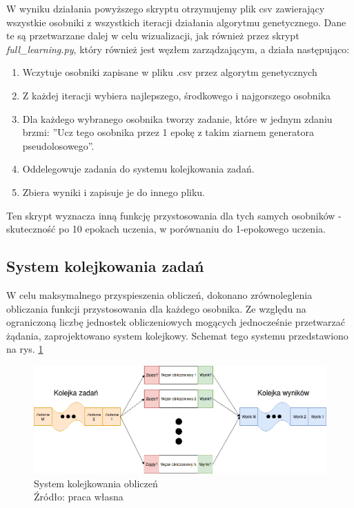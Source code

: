 W wyniku działania powyższego skryptu otrzymujemy plik csv zawierający wszystkie osobniki z wszystkich iteracji działania algorytmu genetycznego.
Dane te są przetwarzane dalej w celu wizualizacji, jak również przez skrypt \textit{full\_learning.py}, który również jest węzłem zarządzającym, a działa następująco:
\begin{enumerate}
  \item Wczytuje osobniki zapisane w pliku .csv przez algorytm genetycznych
  \item Z każdej iteracji wybiera najlepszego, środkowego i najgorszego osobnika
  \item Dla każdego wybranego osobnika tworzy zadanie, które w jednym zdaniu brzmi: ''Ucz tego osobnika przez 1 epokę z takim ziarnem generatora pseudolosowego''.
  \item Oddelegowuje zadania do systemu kolejkowania zadań.
  \item Zbiera wyniki i zapisuje je do innego pliku.
\end{enumerate}
Ten skrypt wyznacza inną funkcję przystosowania dla tych samych osobników - skuteczność po 10 epokach uczenia, w porównaniu do 1-epokowego uczenia.

\subsection{System kolejkowania zadań}\label{sec:queue_system}
W celu maksymalnego przyspieszenia obliczeń, dokonano zrównoleglenia obliczania funkcji przystosowania dla każdego osobnika.
Ze względu na ograniczoną liczbę jednostek obliczeniowych mogących jednocześnie przetwarzać żądania, zaprojektowano system kolejkowy.
Schemat tego systemu przedstawiono na rys. \ref{fig:queue_system}
\begin{figure}[h!tb]
	 \centering
	 \includegraphics[width = 1.1\linewidth]{img/kolejkowanie}
	 \caption{System kolejkowania obliczeń \\
              Źródło: praca własna}
	 \label{fig:queue_system}
\end{figure}

